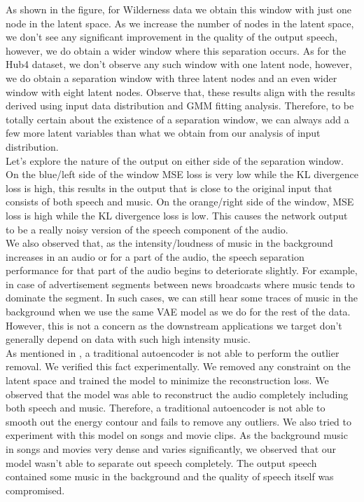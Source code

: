 As shown in the figure, for Wilderness data we obtain this window with just one node in the latent space. As we increase the number of nodes in the latent space, we don't see any significant improvement in the quality of the output speech, however, we do obtain a wider window where this separation occurs. As for the Hub4 dataset, we don't observe any such window with one latent node, however, we do obtain a separation window with three latent nodes and an even wider window with eight latent nodes. Observe that, these results align with the results derived using input data distribution and GMM fitting analysis. Therefore, to be totally certain about the existence of a separation window, we can always add a few more latent variables than what we obtain from our analysis of input distribution. \\

Let's explore the nature of the output on either side of the separation window. On the blue/left side of the window MSE loss is very low while the KL divergence loss is high, this results in the output that is close to the original input that consists of both speech and music. On the orange/right side of the window, MSE loss is high while the KL divergence loss is low. This causes the network output to be a really noisy version of the speech component of the audio.  \\

We also observed that, as the intensity/loudness of music in the background increases in an audio or for a part of the audio, the speech separation performance for that part of the audio begins to deteriorate slightly. For example, in case of advertisement segments between news broadcasts where music tends to dominate the segment. In such cases, we can still hear some traces of music in the background when we use the same VAE model as we do for the rest of the data. However, this is not a concern as the downstream applications we target don't generally depend on data with such high intensity music. \\

As mentioned in \cite{JMLR:v19:17-704}, a traditional autoencoder is not able to perform the outlier removal. We verified this fact experimentally. We removed any constraint on the latent space and trained the model to minimize the reconstruction loss. We observed that the model was able to reconstruct the audio completely including both speech and music. Therefore, a traditional autoencoder is not able to smooth out the energy contour and fails to remove any outliers. We also tried to experiment with this model on songs and movie clips. As the background music in songs and movies very dense and varies significantly, we observed that our model wasn't able to separate out speech completely. The output speech contained some music in the background and the quality of speech itself was compromised.  

